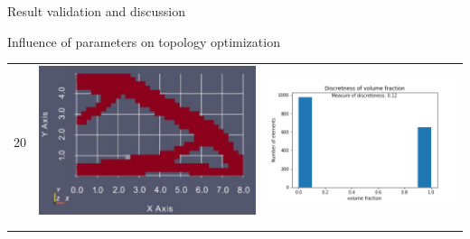 \documentclass[a4paper,12pt,times]{article}
\begin{document}
\begin{section}{Result validation and discussion}
\begin{subsection}{Influence of parameters on topology optimization}
\begin{center}
\begin{table} [H]
\begin{tabular}{c|c|c}
20&\includegraphics[scale = 0.5]{penal_20.png} & \includegraphics[scale = 0.4]{MMA_discretness_penal_20.png}\\
\\\hline\\ 

\end{tabular}
\end{table}
\end{center}
\end{subsection}
\end{section}
\end{document}
